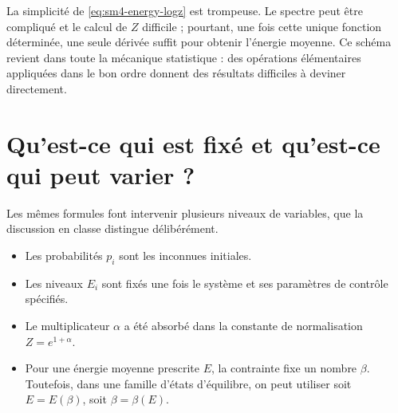 La simplicité de \eqref{eq:sm4-energy-logz} est trompeuse. Le spectre peut être compliqué et le calcul de \(Z\) difficile ; pourtant, une fois cette unique fonction déterminée, une seule dérivée suffit pour obtenir l’énergie moyenne. Ce schéma revient dans toute la mécanique statistique : des opérations élémentaires appliquées dans le bon ordre donnent des résultats difficiles à deviner directement.

\begin{classroomqa}
\end{classroomqa}

\begin{classroomqa}
\end{classroomqa}

\section{Qu’est-ce qui est fixé et qu’est-ce qui peut varier ?}

Les mêmes formules font intervenir plusieurs niveaux de variables, que la discussion en classe distingue délibérément.

\begin{itemize}
 \item Les probabilités \(p_i\) sont les inconnues initiales.
 \item Les niveaux \(E_i\) sont fixés une fois le système et ses paramètres de contrôle spécifiés.
 \item Le multiplicateur \(\alpha\) a été absorbé dans la constante de normalisation \(Z=e^{1+\alpha}\).
 \item Pour une énergie moyenne prescrite \(E\), la contrainte fixe un nombre \(\beta\). Toutefois, dans une famille d’états d’équilibre, on peut utiliser soit \(E=E(\beta)\), soit \(\beta=\beta(E)\).
\end{itemize}

